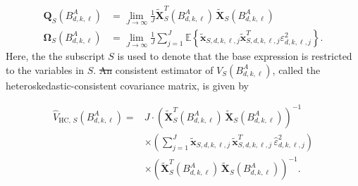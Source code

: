 \documentclass[10pt,a4paper,oneside]{article}
\makeatletter
\newcommand{\E}{\mathbb{E}}
\providecommand{\DIFaddtex}[1]{{\protect\color{blue}\uwave{#1}}} %
\providecommand{\DIFdeltex}[1]{{\protect\color{red}\sout{#1}}} %
\providecommand{\DIFaddbegin}{} %
\providecommand{\DIFaddend}{} %
\providecommand{\DIFdelbegin}{} %
\providecommand{\DIFdelend}{} %
\providecommand{\DIFadd}[1]{\texorpdfstring{\DIFaddtex{#1}}{#1}} %
\providecommand{\DIFdel}[1]{\texorpdfstring{\DIFdeltex{#1}}{}} %
\newcommand{\DIFscaledelfig}{0.5}
\newlength{\DIFdelgraphicswidth} %
\newlength{\DIFdelgraphicsheight} %
\newcommand{\DIFaddincludegraphics}[2][]{{\color{blue}\fbox{\DIFOincludegraphics[#1]{#2}}}} %
\newcommand{\DIFdelincludegraphics}[2][]{%
\sbox{\DIFdelgraphicsbox}{\DIFOincludegraphics[#1]{#2}}%
\settoboxwidth{\DIFdelgraphicswidth}{\DIFdelgraphicsbox} %
\settoboxtotalheight{\DIFdelgraphicsheight}{\DIFdelgraphicsbox} %
\scalebox{\DIFscaledelfig}{%
\parbox[b]{\DIFdelgraphicswidth}{\usebox{\DIFdelgraphicsbox}\\[-\baselineskip] \rule{\DIFdelgraphicswidth}{0em}}\llap{\resizebox{\DIFdelgraphicswidth}{\DIFdelgraphicsheight}{%
\setlength{\unitlength}{\DIFdelgraphicswidth}%
\begin{picture}(1,1)%
\thicklines\linethickness{2pt} %
{\color[rgb]{1,0,0}\put(0,0){\framebox(1,1){}}}%
{\color[rgb]{1,0,0}\put(0,0){\line( 1,1){1}}}%
{\color[rgb]{1,0,0}\put(0,1){\line(1,-1){1}}}%
\end{picture}%
}\hspace*{3pt}}} %
} %
\DeclareRobustCommand{\DIFaddbegin}{\DIFOaddbegin \let\includegraphics\DIFaddincludegraphics} %
\DeclareRobustCommand{\DIFaddend}{\DIFOaddend \let\includegraphics\DIFOincludegraphics} %
\DeclareRobustCommand{\DIFdelbegin}{\DIFOdelbegin \let\includegraphics\DIFdelincludegraphics} %
\DeclareRobustCommand{\DIFdelend}{\DIFOaddend \let\includegraphics\DIFOincludegraphics} %
\let\sout@orig\sout %
\renewcommand{\sout}[1]{\ifmmode\text{\sout@orig{\ensuremath{#1}}}\else\sout@orig{#1}\fi} %
\makeatother
\begin{document}
\begin{align*}
    \mathbf{Q}_S\left(B^A_{d,k,\ell}\right)      & = \lim_{J \rightarrow \infty} \frac{1}{J}\tilde{\mathbf{X}}_{S}^T(B^A_{d,k,\ell})
    \,\tilde{\mathbf{X}}_{S}(B^A_{d,k,\ell})                                                                                                                                                                                          \\
    \mathbf{\Omega}_S\left(B^A_{d,k,\ell}\right) & = \lim_{J \rightarrow \infty} \frac{1}{J} \sum^J_{j = 1} \E \left \{ \tilde{\mathbf{x}}_{S,d,k,\ell,j} \tilde{\mathbf{x}}_{S,d,k,\ell,j}^T \varepsilon^2_{d, k, \ell, j} \right\}.
\end{align*}
Here, the the subscript $S$ is used to denote that the base expression is restricted to the variables in $S$. \DIFdelbegin \DIFdel{An }\DIFdelend \DIFaddbegin \DIFadd{A }\DIFaddend consistent estimator of $V_S\left( B^A_{d,k,\ell} \right)$, called the heteroskedastic-consistent covariance matrix, is given by

\begin{align*}
    \hat{V}_{\mathrm{HC},\,S} \left( B^A_{d, k, \ell} \right)
    ={} &
    J \cdot \left(\tilde{\mathbf{X}}_{S}^T(B^A_{d,k,\ell})
    \,\tilde{\mathbf{X}}_{S}(B^A_{d,k,\ell})\right)^{-1} \\
        & \times
    \left(\sum_{j=1}^J
    \tilde{\mathbf{x}}_{S,d,k,\ell,j}
    \,\tilde{\mathbf{x}}_{S,d,k,\ell,j}^T\,
    \hat{\varepsilon}^2_{d,k,\ell,j}\right)              \\
        & \times
    \left(\tilde{\mathbf{X}}_{S}^T(B^A_{d,k,\ell})
    \,\tilde{\mathbf{X}}_{S}(B^A_{d,k,\ell})\right)^{-1}.
\end{align*}
\end{document}
